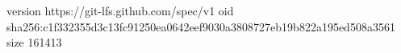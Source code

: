 version https://git-lfs.github.com/spec/v1
oid sha256:c1f332355d3c13fc91250ea0642eef9030a3808727eb19b822a195ed508a3561
size 161413
